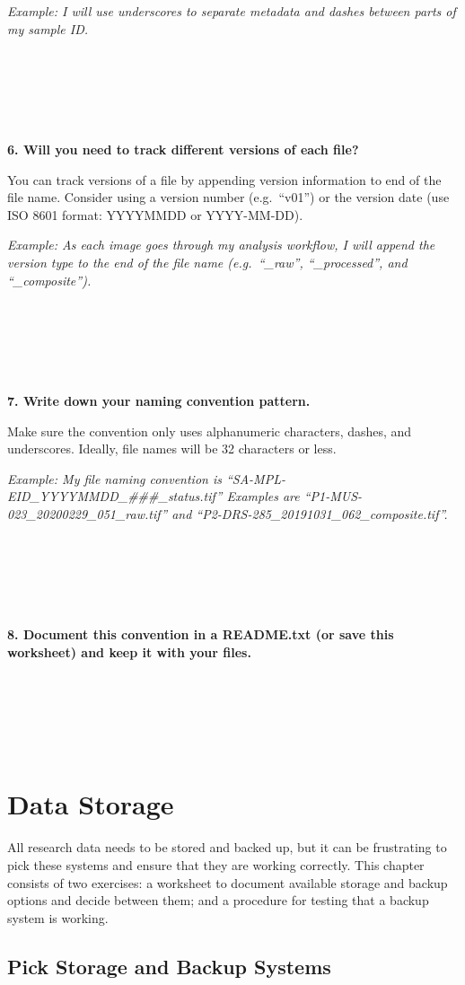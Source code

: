 \documentclass[
]{book}
\begin{document}
\emph{Example: I will use underscores to separate metadata and dashes between parts of my sample ID.}

~

~

~

\textbf{6. Will you need to track different versions of each file?}

You can track versions of a file by appending version information to end of the file name. Consider using a version number (e.g.~``v01'') or the version date (use ISO 8601 format: YYYYMMDD or YYYY-MM-DD).

\emph{Example: As each image goes through my analysis workflow, I will append the version type to the end of the file name (e.g.~``\_raw'', ``\_processed'', and ``\_composite'').}

~

~

~

\textbf{7. Write down your naming convention pattern.}

Make sure the convention only uses alphanumeric characters, dashes, and underscores. Ideally, file names will be 32 characters or less.

\emph{Example: My file naming convention is ``SA-MPL-EID\_YYYYMMDD\_\#\#\#\_status.tif'' Examples are ``P1-MUS-023\_20200229\_051\_raw.tif'' and ``P2-DRS-285\_20191031\_062\_composite.tif''.}

~

~

~

\textbf{8. Document this convention in a README.txt (or save this worksheet) and keep it with your files.}

~

~

~

\hypertarget{data-storage}{%
\chapter{Data Storage}\label{data-storage}}

All research data needs to be stored and backed up, but it can be frustrating to pick these systems and ensure that they are working correctly. This chapter consists of two exercises: a worksheet to document available storage and backup options and decide between them; and a procedure for testing that a backup system is working.

\hypertarget{storage}{%
\section{Pick Storage and Backup Systems}\label{storage}}
\end{document}

